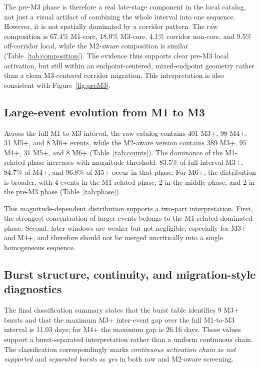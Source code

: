 \documentclass[11pt]{article}
\begin{document}
The pre-M3 phase is therefore a real late-stage component in the local catalog, not just a visual artifact of combining the whole interval into one sequence. However, it is not spatially dominated by a corridor pattern. The raw composition is 67.4\% M1-core, 18.0\% M3-core, 4.1\% corridor non-core, and 9.5\% off-corridor local, while the M2-aware composition is similar (Table~\ref{tab:composition}). The evidence thus supports clear pre-M3 local activation, but still within an endpoint-centered, mixed-endpoint geometry rather than a clean M3-centered corridor migration. This interpretation is also consistent with Figure~\ref{fig:preM3}.

\subsection{Large-event evolution from M1 to M3}
Across the full M1-to-M3 interval, the raw catalog contains 401 M3+, 98 M4+, 31 M5+, and 8 M6+ events, while the M2-aware version contains 389 M3+, 95 M4+, 31 M5+, and 8 M6+ (Table~\ref{tab:counts}). The dominance of the M1-related phase increases with magnitude threshold: 83.5\% of full-interval M3+, 84.7\% of M4+, and 96.8\% of M5+ occur in that phase. For M6+, the distribution is broader, with 4 events in the M1-related phase, 2 in the middle phase, and 2 in the pre-M3 phase (Table~\ref{tab:phase}).

This magnitude-dependent distribution supports a two-part interpretation. First, the strongest concentration of larger events belongs to the M1-related dominated phase. Second, later windows are weaker but not negligible, especially for M3+ and M4+, and therefore should not be merged uncritically into a single homogeneous sequence.

\subsection{Burst structure, continuity, and migration-style diagnostics}
The final classification summary states that the burst table identifies 9 M3+ bursts and that the maximum M3+ inter-event gap over the full M1-to-M3 interval is 11.03 days; for M4+ the maximum gap is 26.16 days. These values support a burst-separated interpretation rather than a uniform continuous chain. The classification correspondingly marks \emph{continuous activation chain} as \emph{not supported} and \emph{separated bursts} as \emph{yes} in both raw and M2-aware screening.
\end{document}
